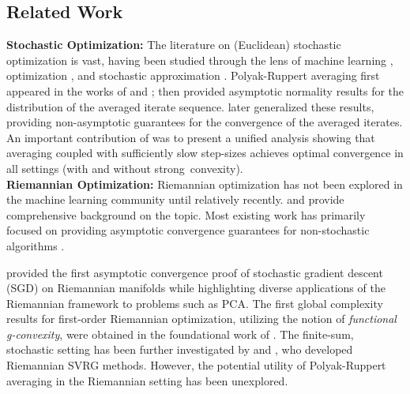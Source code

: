 \subsection{Related Work}
\vspace*{-.0856cm}
\textbf{Stochastic Optimization:}
The literature on (Euclidean) stochastic optimization is vast, having been studied through the lens of machine learning \citep{bottou-98x, ShaShaSreSri09}, optimization \citep{NesVia08}, and stochastic approximation \citep{KusYin03}.
Polyak-Ruppert averaging first appeared in the works of \citet{Pol90} and \citet{ruppert1988efficient}; \citet{polyak1992acceleration} then provided asymptotic normality results for
the distribution of the averaged iterate sequence. \citet{moulines2011non} later generalized these results, providing non-asymptotic guarantees for the convergence of the averaged iterates.
An important contribution of \citet{moulines2011non} was to present a unified analysis showing that  averaging coupled with sufficiently slow step-sizes achieves
optimal convergence in all settings (with and without strong~convexity).
\\
\textbf{Riemannian Optimization:}
Riemannian optimization has not been explored in the machine learning community until relatively recently. \citet{udriste1994convex} and
\citet{absil2009optimization} provide comprehensive background on the topic. Most existing work has primarily focused on providing asymptotic convergence guarantees for non-stochastic algorithms \citep[see, e.g.,][who analyze the convergence of Riemannian trust-region and Riemannian L-BFGS methods]{Absil2007,ring2012optimization}.

\citet{bonnabel2013stochastic}
provided the first asymptotic convergence
proof of stochastic gradient descent (SGD) on Riemannian manifolds while highlighting diverse applications of the Riemannian framework to problems such as PCA.
The first global complexity results for first-order Riemannian optimization, utilizing the notion of \emph{functional g-convexity}, were obtained
in the foundational work of \citet{zhang2016first}. The finite-sum, stochastic setting has been further investigated by \citet{zhang2016riemannian} and \citet{sato2017riemannian}, who developed Riemannian SVRG methods. However, the potential utility of Polyak-Ruppert averaging in the Riemannian setting has been unexplored.
